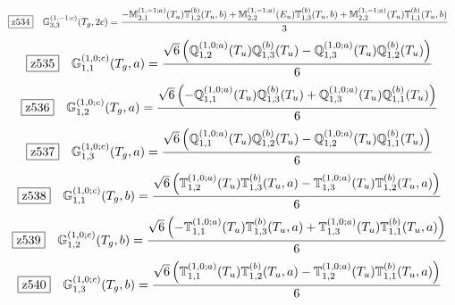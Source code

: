\documentclass[fleqn,10pt,landscape]{jsarticle}
\begin{document}
\begin{dmath*}
\hspace*{3mm}\fbox{z534}\quad \mathbb{G}_{3,3}^{(1,-1;c)}(T_{g},2c)=\frac{- \mathbb{M}_{2,1}^{(1,-1;a)}(T_{u}) \mathbb{T}_{1,2}^{(b)}(T_{u},b) + \mathbb{M}_{2,2}^{(1,-1;a)}(E_{u}) \mathbb{T}_{1,3}^{(b)}(T_{u},b) + \mathbb{M}_{2,2}^{(1,-1;a)}(T_{u}) \mathbb{T}_{1,1}^{(b)}(T_{u},b)}{3}
\end{dmath*}
\begin{dmath*}
\hspace*{3mm}\fbox{z535}\quad \mathbb{G}_{1,1}^{(1,0;c)}(T_{g},a)=\frac{\sqrt{6} \left(\mathbb{Q}_{1,2}^{(1,0;a)}(T_{u}) \mathbb{Q}_{1,3}^{(b)}(T_{u}) - \mathbb{Q}_{1,3}^{(1,0;a)}(T_{u}) \mathbb{Q}_{1,2}^{(b)}(T_{u})\right)}{6}
\end{dmath*}
\begin{dmath*}
\hspace*{3mm}\fbox{z536}\quad \mathbb{G}_{1,2}^{(1,0;c)}(T_{g},a)=\frac{\sqrt{6} \left(- \mathbb{Q}_{1,1}^{(1,0;a)}(T_{u}) \mathbb{Q}_{1,3}^{(b)}(T_{u}) + \mathbb{Q}_{1,3}^{(1,0;a)}(T_{u}) \mathbb{Q}_{1,1}^{(b)}(T_{u})\right)}{6}
\end{dmath*}
\begin{dmath*}
\hspace*{3mm}\fbox{z537}\quad \mathbb{G}_{1,3}^{(1,0;c)}(T_{g},a)=\frac{\sqrt{6} \left(\mathbb{Q}_{1,1}^{(1,0;a)}(T_{u}) \mathbb{Q}_{1,2}^{(b)}(T_{u}) - \mathbb{Q}_{1,2}^{(1,0;a)}(T_{u}) \mathbb{Q}_{1,1}^{(b)}(T_{u})\right)}{6}
\end{dmath*}
\begin{dmath*}
\hspace*{3mm}\fbox{z538}\quad \mathbb{G}_{1,1}^{(1,0;c)}(T_{g},b)=\frac{\sqrt{6} \left(\mathbb{T}_{1,2}^{(1,0;a)}(T_{u}) \mathbb{T}_{1,3}^{(b)}(T_{u},a) - \mathbb{T}_{1,3}^{(1,0;a)}(T_{u}) \mathbb{T}_{1,2}^{(b)}(T_{u},a)\right)}{6}
\end{dmath*}
\begin{dmath*}
\hspace*{3mm}\fbox{z539}\quad \mathbb{G}_{1,2}^{(1,0;c)}(T_{g},b)=\frac{\sqrt{6} \left(- \mathbb{T}_{1,1}^{(1,0;a)}(T_{u}) \mathbb{T}_{1,3}^{(b)}(T_{u},a) + \mathbb{T}_{1,3}^{(1,0;a)}(T_{u}) \mathbb{T}_{1,1}^{(b)}(T_{u},a)\right)}{6}
\end{dmath*}
\begin{dmath*}
\hspace*{3mm}\fbox{z540}\quad \mathbb{G}_{1,3}^{(1,0;c)}(T_{g},b)=\frac{\sqrt{6} \left(\mathbb{T}_{1,1}^{(1,0;a)}(T_{u}) \mathbb{T}_{1,2}^{(b)}(T_{u},a) - \mathbb{T}_{1,2}^{(1,0;a)}(T_{u}) \mathbb{T}_{1,1}^{(b)}(T_{u},a)\right)}{6}
\end{dmath*}
\end{document}
